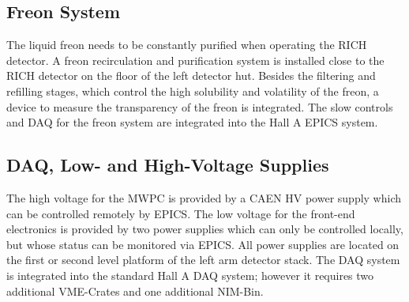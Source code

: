 {\subsection{Freon System}
The liquid freon needs to be constantly purified when operating the RICH detector.
A freon recirculation and purification system is installed close to the RICH detector 
on the floor of the left detector hut. Besides the filtering and refilling stages,
which control the high solubility and volatility of the freon, a device to measure
the transparency of the freon is integrated. The slow controls and DAQ for the freon
system are integrated into the Hall A EPICS system.

\subsection{DAQ, Low- and High-Voltage Supplies}
The high voltage for the MWPC is provided by a CAEN HV power supply which can
be controlled remotely by EPICS. The low voltage for the front-end electronics 
is provided by two power supplies which can only be controlled locally, but
whose status can be monitored via EPICS.
All power supplies are located on the first or second level platform of the 
left arm detector stack. The DAQ system is integrated into the standard Hall A 
DAQ system; however it requires two additional VME-Crates and one additional 
NIM-Bin.
}


